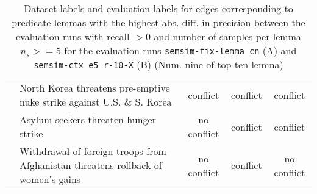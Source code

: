 \begin{sidewaystable}[ht]
\begin{tabular}{l p{13cm} ccc}
& North Korea threatens pre-emptive nuke strike against U.S. \& S. Korea & conflict & conflict & conflict \\
& Asylum seekers threaten hunger strike & no conflict & conflict & conflict \\
& Withdrawal of foreign troops from Afghanistan threatens rollback of women's gains & no conflict & conflict & no conflict \\
\bottomrule
\end{tabular}
\caption{Dataset labels and evaluation labels for edges corresponding to predicate lemmas with the highest abs. diff. in precision between the evaluation runs with recall \(> 0\) and number of samples per lemma \(n_s >= 5\) for the evaluation runs \texttt{semsim-fix-lemma cn} (A) and \texttt{semsim-ctx e5 r-10-X} (B) (Num. nine of top ten lemma)}
\end{sidewaystable}


